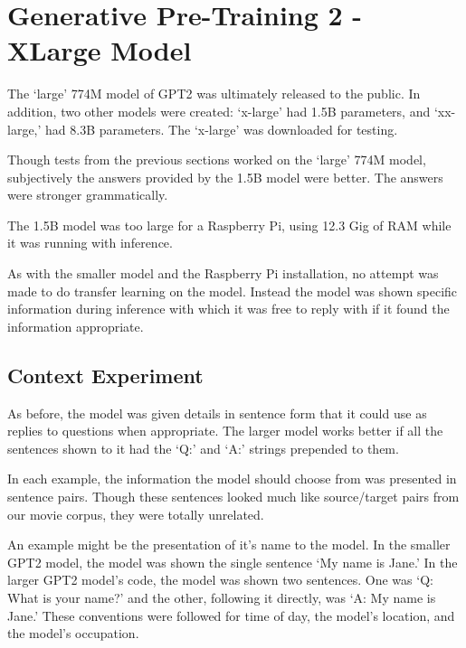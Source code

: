 
\section{Generative Pre-Training 2 - XLarge Model}

The `large' 774M model of GPT2 was ultimately released to the public. In addition, two other models were created: `x-large' had 1.5B parameters, and `xx-large,' had 8.3B parameters. The `x-large' was downloaded for testing.

Though tests from the previous sections worked on the `large' 774M model, subjectively the answers provided by the 1.5B model were better. The answers were stronger grammatically.

The 1.5B model was too large for a Raspberry Pi, using 12.3 Gig of RAM while it was running with inference. %

As with the smaller model and the Raspberry Pi installation, no attempt was made to do transfer learning on the model. Instead the model was shown specific information during inference with which it was free to reply with if it found the information appropriate.


\label{chapter-gpt2-xl-intro}

\subsection{Context Experiment}

As before, the model was given details in sentence form that it could use as replies to questions when appropriate. The larger model works better if all the sentences shown to it had the `Q:' and `A:' strings prepended to them. 

In each example, the information the model should choose from was presented in sentence pairs. Though these sentences looked much like source/target pairs from our movie corpus, they were totally unrelated.

An example might be the presentation of it's name to the model. In the smaller GPT2 model, the model was shown the single sentence `My name is Jane.' In the larger GPT2 model's code, the model was shown two sentences. One was `Q: What is your name?' and the other, following it directly, was `A: My name is Jane.' These conventions were followed for time of day, the model's location, and the model's occupation.

